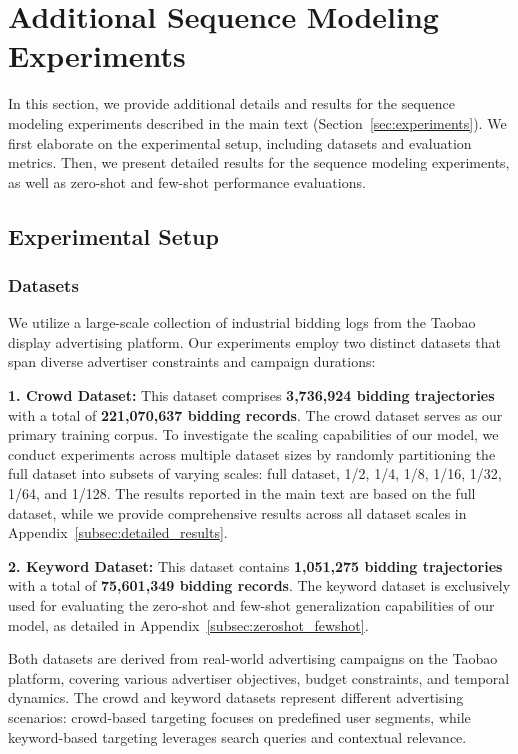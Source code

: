 \section{Additional Sequence Modeling Experiments}
\label{app:add_exp}

In this section, we provide additional details and results for the sequence modeling experiments described in the main text (Section~\ref{sec:experiments}). We first elaborate on the experimental setup, including datasets and evaluation metrics. Then, we present detailed results for the sequence modeling experiments, as well as zero-shot and few-shot performance evaluations.

\subsection{Experimental Setup}

\subsubsection{Datasets}
We utilize a large-scale collection of industrial bidding logs from the Taobao display advertising platform. Our experiments employ two distinct datasets that span diverse advertiser constraints and campaign durations:

\textbf{1. Crowd Dataset:} This dataset comprises \textbf{3,736,924 bidding trajectories} with a total of \textbf{221,070,637 bidding records}. The crowd dataset serves as our primary training corpus. To investigate the scaling capabilities of our model, we conduct experiments across multiple dataset sizes by randomly partitioning the full dataset into subsets of varying scales: full dataset, 1/2, 1/4, 1/8, 1/16, 1/32, 1/64, and 1/128. The results reported in the main text are based on the full dataset, while we provide comprehensive results across all dataset scales in Appendix~\ref{subsec:detailed_results}.

\textbf{2. Keyword Dataset:} This dataset contains \textbf{1,051,275 bidding trajectories} with a total of \textbf{75,601,349 bidding records}. The keyword dataset is exclusively used for evaluating the zero-shot and few-shot generalization capabilities of our model, as detailed in Appendix~\ref{subsec:zeroshot_fewshot}.

Both datasets are derived from real-world advertising campaigns on the Taobao platform, covering various advertiser objectives, budget constraints, and temporal dynamics. The crowd and keyword datasets represent different advertising scenarios: crowd-based targeting focuses on predefined user segments, while keyword-based targeting leverages search queries and contextual relevance.

